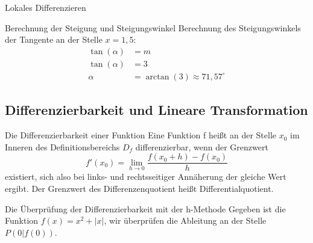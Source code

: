 \begin{section}{Lokales Differenzieren}
\begin{bsp*}{Berechnung der Steigung und Steigungswinkel}{}
Berechnung des Steigungswinkels der Tangente an der Stelle $x=1,5 $: 
\begin{equation*}
\begin{split}
\tan{(\alpha)} &= m\\
\tan{(\alpha)} &= 3\\
\alpha &= \arctan{(3)} \approx 71,57^{\circ}  
\end{split}
\end{equation*}
\end{bsp*}
\subsection{Differenzierbarkeit und Lineare Transformation} 
\begin{defi}{Die Differenzierbarkeit einer Funktion}{}
 Eine Funktion f heißt an der Stelle $x_0$ im Inneren des Definitionsbereichs $D_f$ differenzierbar, wenn der Grenzwert \begin{equation*}
     f'(x_0) =\lim_{h\rightarrow 0}\dfrac{f(x_0 +h) -f(x_0)}{h}
 \end{equation*} existiert, sich also bei links- und rechtsseitiger Annäherung der gleiche Wert ergibt. Der Grenzwert des Differenzenquotient heißt Differentialquotient.
\end{defi}
\begin{bsp*}{Die Überprüfung der Differenzierbarkeit mit der h-Methode}
    Gegeben ist die Funktion $f(x)= x^2 + |x|$, wir überprüfen die Ableitung an der Stelle $P(0|f(0))$.


\end{bsp*}
\end{section}
